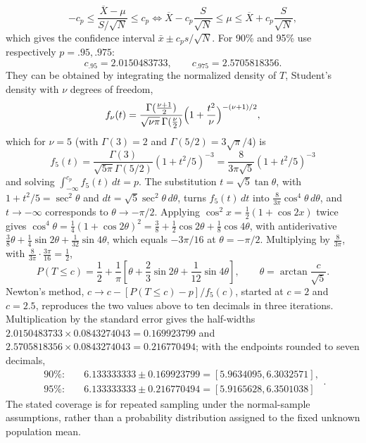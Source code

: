 \[
-c_p\le\frac{\overline X-\mu}{S/\sqrt N}\le c_p
\iff
\overline X-c_p\frac S{\sqrt N}\le\mu
\le\overline X+c_p\frac S{\sqrt N},
\]
which gives the confidence interval $\bar x\pm c_p s/\sqrt N$.
For 90\% and 95\% use respectively $p=.95,.975$:
\[
c_{.95}=2.0150483733,\qquad c_{.975}=2.5705818356.
\]
They can be obtained by integrating the normalized density of $T$,
Student's density with $\nu$ degrees of freedom,
\[
f_\nu(t)=\frac{\Gamma(\frac{\nu+1}2)}{\sqrt{\nu\pi}\,\Gamma(\frac\nu2)}
\Bigl(1+\frac{t^2}\nu\Bigr)^{-(\nu+1)/2},
\]
which for $\nu=5$ (with $\Gamma(3)=2$ and $\Gamma(5/2)=3\sqrt\pi/4$) is
\[
f_5(t)=\frac{\Gamma(3)}{\sqrt{5\pi}\Gamma(5/2)}
(1+t^2/5)^{-3}=\frac8{3\pi\sqrt5}(1+t^2/5)^{-3}
\]
and solving $\int_{-\infty}^{c_p}f_5(t)\,dt=p$. The substitution
$t=\sqrt5\tan\theta$, with $1+t^2/5=\sec^2\theta$ and
$dt=\sqrt5\sec^2\theta\,d\theta$, turns $f_5(t)\,dt$ into
$\frac8{3\pi}\cos^4\theta\,d\theta$, and $t\to-\infty$ corresponds to
$\theta\to-\pi/2$. Applying $\cos^2x=\frac12(1+\cos2x)$ twice gives
$\cos^4\theta=\frac14(1+\cos2\theta)^2
=\frac38+\frac12\cos2\theta+\frac18\cos4\theta$, with antiderivative
$\frac38\theta+\frac14\sin2\theta+\frac1{32}\sin4\theta$, which
equals $-3\pi/16$ at $\theta=-\pi/2$. Multiplying by $\frac8{3\pi}$,
with $\frac8{3\pi}\cdot\frac{3\pi}{16}=\frac12$,
\[
P(T\le c)=\frac12+\frac1\pi\left[\theta+\frac23\sin2\theta
+\frac1{12}\sin4\theta\right],\qquad\theta=\arctan\frac c{\sqrt5}.
\]
Newton's method, $c\to c-[P(T\le c)-p]/f_5(c)$, started at $c=2$ and
$c=2.5$, reproduces the two values above to ten decimals in three
iterations.
Multiplication by the standard error gives the half-widths
$2.0150483733\times0.0843274043=0.169923799$ and
$2.5705818356\times0.0843274043=0.216770494$; with the endpoints rounded
to seven decimals,
\[
\boxed{\begin{aligned}
90\%:&\quad6.133333333\pm0.169923799
 =[5.9634095,6.3032571],\\
95\%:&\quad6.133333333\pm0.216770494
 =[5.9165628,6.3501038]
\end{aligned}}.
\]
The stated coverage is for repeated sampling under the normal-sample
assumptions, rather than a probability distribution assigned to the
fixed unknown population mean.
